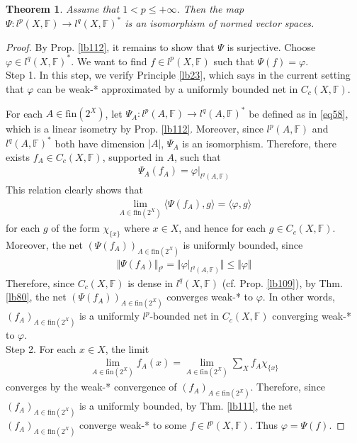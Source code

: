 \documentclass[12pt,b5paper,notitlepage]{article}
\theoremstyle{definition}
\theoremstyle{plain}
\newtheorem{thm}[df]{Theorem}
\newcommand{\bk}[1]{\langle {#1}\rangle}
\newcommand{\fin}{\mathrm{fin}}
\newcommand{\Fbb}{\mathbb F}
\numberwithin{equation}{section}
\begin{document}
\begin{thm}\label{lb127}
Assume that $1<p\leq+\infty$. Then the map $\Psi:l^p(X,\Fbb)\rightarrow l^q(X,\Fbb)^*$ is an isomorphism of normed vector spaces.
\end{thm}



\begin{proof}
By Prop. \ref{lb112}, it remains to show that $\Psi$ is surjective. Choose $\varphi\in l^q(X,\Fbb)^*$. We want to find $f\in l^p(X,\Fbb)$ such that $\Psi(f)=\varphi$. \\[-1ex]

Step 1. In this step, we verify Principle \ref{lb23}, which says in the current setting that $\varphi$ can be weak-* approximated by a uniformly bounded net in $C_c(X,\Fbb)$. 

For each $A\in\fin(2^X)$, let $\Psi_A:l^p(A,\Fbb)\rightarrow l^q(A,\Fbb)^*$ be defined as in \eqref{eq58}, which is a linear isometry by Prop. \ref{lb112}. Moreover, since $l^p(A,\Fbb)$ and $l^q(A,\Fbb)^*$ both have dimension $|A|$, $\Psi_A$ is an isomorphism. Therefore, there exists $f_A\in C_c(X,\Fbb)$, supported in $A$, such that
\begin{align*}
\Psi_A(f_A)=\varphi|_{l^q(A,\Fbb)}
\end{align*}
This relation clearly shows that
\begin{align*}
\lim_{A\in\fin(2^X)}\bk{\Psi(f_A),g}=\bk{\varphi,g}
\end{align*}
for each $g$ of the form $\chi_{\{x\}}$ where $x\in X$, and hence for each $g\in C_c(X,\Fbb)$. Moreover, the net $(\Psi(f_A))_{A\in\fin(2^X)}$ is uniformly bounded, since
\begin{align*}
\Vert\Psi(f_A)\Vert_{l^p}=\Vert\varphi|_{l^q(A,\Fbb)}\Vert\leq\Vert\varphi\Vert
\end{align*}
Therefore, since $C_c(X,\Fbb)$ is dense in $l^q(X,\Fbb)$ (cf. Prop. \ref{lb109}), by Thm. \ref{lb80}, the net $(\Psi(f_A))_{A\in\fin(2^X)}$ converges weak-* to $\varphi$. In other words, $(f_A)_{A\in\fin(2^X)}$ is a uniformly $l^p$-bounded net in $C_c(X,\Fbb)$ converging weak-* to $\varphi$.\\[-1ex]

Step 2. For each $x\in X$, the limit
\begin{align*}
\lim_{A\in\fin(2^X)}f_A(x)=\lim_{A\in\fin(2^X)}\sum_X f_A\chi_{\{x\}}
\end{align*}
converges by the weak-* convergence of $(f_A)_{A\in\fin(2^X)}$. Therefore, since $(f_A)_{A\in\fin(2^X)}$ is a uniformly bounded, by Thm. \ref{lb111}, the net $(f_A)_{A\in\fin(2^X)}$ converge weak-* to some $f\in l^p(X,\Fbb)$. Thus $\varphi=\Psi(f)$.
\end{proof}
\end{document}
